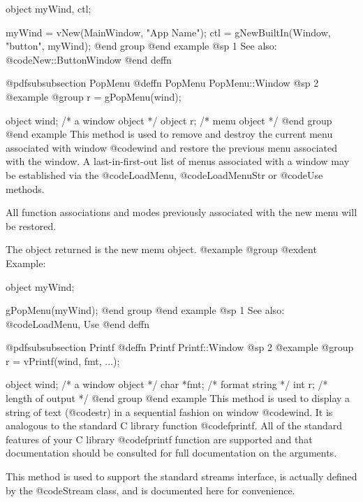 object  myWind, ctl;

myWind = vNew(MainWindow, "App Name");
ctl = gNewBuiltIn(Window, "button", myWind);
@end group
@end example
@sp 1
See also:  @code{New::ButtonWindow}
@end deffn












@pdfsubsubsection {PopMenu}
@deffn {PopMenu} PopMenu::Window
@sp 2
@example
@group
r = gPopMenu(wind);

object   wind;  /*  a window object  */
object   r;     /*  menu object      */
@end group
@end example
This method is used to remove and destroy the current menu associated
with window @code{wind} and restore the previous menu associated with
the window.  A last-in-first-out list of menus associated with a window
may be established via the @code{LoadMenu}, @code{LoadMenuStr} or
@code{Use} methods.

All function associations and modes previously associated with the
new menu will be restored.

The object returned is the new menu object.
@example
@group
@exdent Example:

object  myWind;

gPopMenu(myWind);
@end group
@end example
@sp 1
See also:  @code{LoadMenu, Use}
@end deffn











@pdfsubsubsection {Printf}
@deffn {Printf} Printf::Window
@sp 2
@example
@group
r = vPrintf(wind, fmt, ...);

object   wind;  /*  a window object       */
char    *fmt;   /*  format string         */
int      r;     /*  length of output      */
@end group
@end example
This method is used to display a string of text (@code{str}) in a sequential
fashion on window @code{wind}.  It is analogous to the standard C library
function @code{fprintf}.  All of the standard features of your C library
@code{fprintf} function are supported and that documentation should be
consulted for full documentation on the arguments.

This method is used to support the standard streams interface, is
actually defined by the @code{Stream} class, and is documented here for
convenience.

